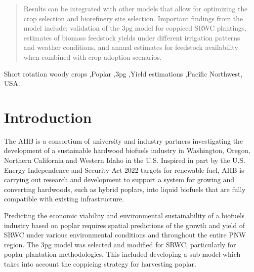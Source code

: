 \documentclass[preprint,12pt]{elsarticle}
\begin{document}
\begin{frontmatter}
\begin{abstract}
  Results can be integrated with other models that allow for
  optimizing the crop selection and biorefinery site selection.
  Important findings from the model include; validation of the
  \ac{3pg} model for coppiced \ac{SRWC} plantings, estimates of
  biomass feedstock yields under different irrigation patterns and
  weather conditions, and annual estimates for feedstock availability
  when combined with crop adoption scenarios.

\end{abstract}

\begin{keyword}
  Short rotation woody crops \sep Poplar \sep \ac{3pg} \sep Yield
  estimations \sep Pacific Northwest, USA.



\end{keyword}

\end{frontmatter}


\section{Introduction}
\label{sec:introduction}
The \acf{AHB} is a consortium of university and industry partners
investigating the development of a sustainable hardwood biofuels
industry in Washington, Oregon, Northern California and Western Idaho
in the U.S.  Inspired in part by the U.S. Energy Independence and
Security Act 2022 targets for renewable fuel, \ac{AHB} is carrying out
research and development to support a system for growing and
converting hardwoods, such as hybrid poplars, into liquid biofuels
that are fully compatible with existing infrastructure.

Predicting the economic viability and environmental sustainability of
a biofuels industry based on poplar requires spatial predictions of
the growth and yield of \acf{SRWC} under various environmental
conditions and throughout the entire \acf{PNW} region.  The \acf{3pg}
model was selected and modified for \ac{SRWC}, particularly for poplar
plantation methodologies.  This included developing a sub-model which
takes into account the coppicing strategy for harvesting poplar.
\end{document}
